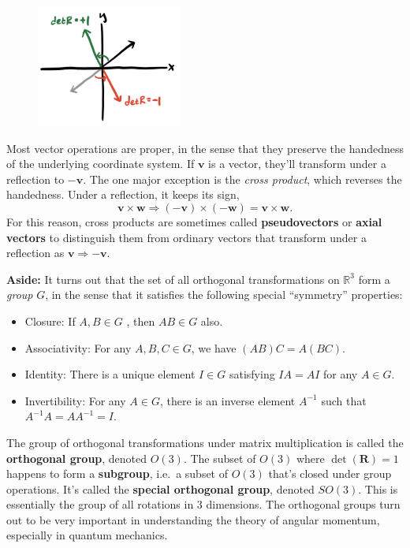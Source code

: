 \documentclass[
  letterpaper,
  DIV=11,
  numbers=noendperiod]{scrreprt}
\providecommand{\tightlist}{%
  \setlength{\itemsep}{0pt}\setlength{\parskip}{0pt}}\usepackage{longtable,booktabs,array}
\begin{document}
\begin{figure}

{\centering \includegraphics[width=1.875in,height=\textheight]{classical-mechanics/./resources/image-20230216104709404.png}

}

\end{figure}

Most vector operations are proper, in the sense that they preserve the
handedness of the underlying coordinate system. If \(\mathbf{v}\) is a
vector, they'll transform under a reflection to \(-\mathbf{v}\). The one
major exception is the \emph{cross product}, which reverses the
handedness. Under a reflection, it keeps its sign, \[
\mathbf{v} \times \mathbf{w} \Rightarrow (-\mathbf{v}) \times (-\mathbf{w}) = \mathbf{v} \times \mathbf{w}.
\] For this reason, cross products are sometimes called
\textbf{pseudovectors} or \textbf{axial vectors} to distinguish them
from ordinary vectors that transform under a reflection as
\(\mathbf{v} \Rightarrow -\mathbf{v}\).

\textbf{Aside:} It turns out that the set of all orthogonal
transformations on \(\mathbb{R}^3\) form a \emph{group} \(G\), in the
sense that it satisfies the following special ``symmetry'' properties:

\begin{itemize}
\tightlist
\item
  Closure: If \(A, B \in G\) , then \(AB \in G\) also.
\item
  Associativity: For any \(A,B,C \in G\), we have \((AB)C = A(BC)\).
\item
  Identity: There is a unique element \(I \in G\) satisfying \(IA = AI\)
  for any \(A \in G\).
\item
  Invertibility: For any \(A \in G\), there is an inverse element
  \(A^{-1}\) such that \(A^{-1} A = A A^{-1} = I\).
\end{itemize}

The group of orthogonal transformations under matrix multiplication is
called the \textbf{orthogonal group}, denoted \(O(3)\). The subset of
\(O(3)\) where \(\det(\mathbf{R})=1\) happens to form a
\textbf{subgroup}, i.e.~a subset of \(O(3)\) that's closed under group
operations. It's called the \textbf{special orthogonal group}, denoted
\(SO(3)\). This is essentially the group of all rotations in 3
dimensions. The orthogonal groups turn out to be very important in
understanding the theory of angular momentum, especially in quantum
mechanics.
\end{document}
